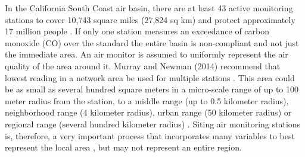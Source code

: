 In the California South Coast air basin, there are at least 43 active monitoring stations \citep{CARB2013} to cover 10,743 square miles (27,824 sq km) and protect approximately 17 million people \citep{AQMD2010}.  If only one station measures an exceedance of carbon monoxide (CO) over the standard the entire basin is non-compliant and not just the immediate area.  An air monitor is assumed to uniformly represent the air quality of the area around it.  Murray and Newman (2014) recommend that lowest reading in a network area be used for multiple stations \cite{Murray2014}. This area could be as small as several hundred square meters in a micro-scale range of up to 100 meter radius from the station, to a middle range (up to 0.5 kilometer radius), neighborhood range (4 kilometer radius), urban range (50 kilometer radius) or regional range (several hundred kilometer radius) \citep{Pan2009}.  Siting air monitoring stations is, therefore, a very important process that incorporates many variables to best represent the local area \citep{Bermudez2010}, but may not represent an entire region.


